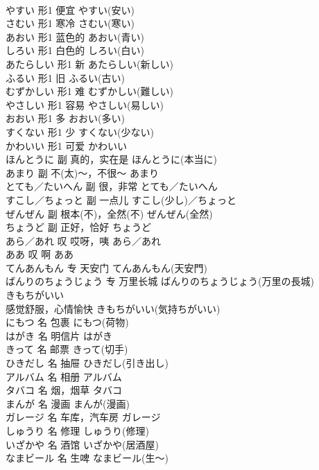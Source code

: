 \documentclass[8pt]{extreport}
\begin{document}
\begin{CJK}{UTF8}{min}
\\	やすい	形1	便宜	やすい(安い)	
\\	さむい	形1	寒冷	さむい(寒い)	
\\	あおい	形1	蓝色的	あおい(青い)	
\\	しろい	形1	白色的	しろい(白い)	
\\	あたらしい	形1	新	あたらしい(新しい)	
\\	ふるい	形1	旧	ふるい(古い)	
\\	むずかしい	形1	难	むずかしい(難しい)	
\\	やさしい	形1	容易	やさしい(易しい)	
\\	おおい	形1	多	おおい(多い)	
\\	すくない	形1	少	すくない(少ない)	
\\	かわいい	形1	可爱	かわいい	
\\	ほんとうに	副	真的，实在是	ほんとうに(本当に)	
\\	あまり	副	不(太)～，不很～	あまり	
\\	とても／たいへん	副	很，非常	とても／たいへん	
\\	すこし／ちょっと	副	一点儿	すこし(少し)／ちょっと	
\\	ぜんぜん	副	根本(不)，全然(不)	ぜんぜん(全然)	
\\	ちょうど	副	正好，恰好	ちょうど	
\\	あら／あれ	叹	哎呀，咦	あら／あれ	
\\	ああ	叹	啊	ああ	
\\	てんあんもん	专	天安门	てんあんもん(天安門)	
\\	ばんりのちょうじょう	专	万里长城	ばんりのちょうじょう(万里の長城)	
\\	きもちがいい	
\\	感觉舒服，心情愉快	きもちがいい(気持ちがいい)	
\\	にもつ	名	包裹	にもつ(荷物)	
\\	はがき	名	明信片	はがき	
\\	きって	名	邮票	きって(切手)	
\\	ひきだし	名	抽屉	ひきだし(引き出し)	
\\	アルバム	名	相册	アルバム	
\\	タバコ	名	烟，烟草	タバコ	
\\	まんが	名	漫画	まんが(漫画)	
\\	ガレージ	名	车库，汽车房	ガレージ	
\\	しゅうり	名	修理	しゅうり(修理)	
\\	いざかや	名	酒馆	いざかや(居酒屋)	
\\	なまビール	名	生啤	なまビール(生～)	

\end{CJK}
\end{document}
